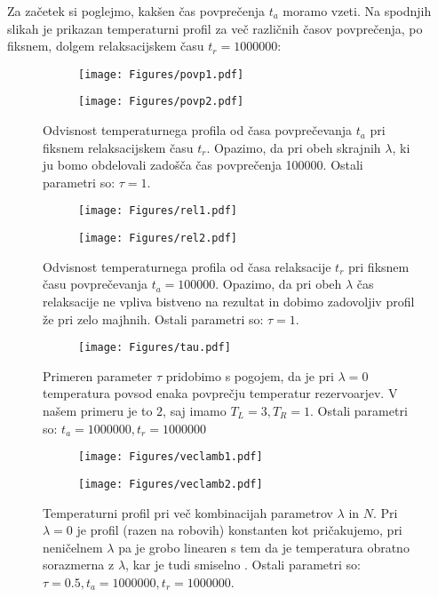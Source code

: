 \documentclass{article}
\begin{document}
Za začetek si poglejmo, kakšen čas povprečenja $t_a$ moramo vzeti. Na spodnjih slikah je prikazan temperaturni profil za več različnih časov povprečenja, po fiksnem, dolgem relaksacijskem času $t_r=1000000$:
\begin{figure}[H]
\centering
\begin{subfigure}{.49\textwidth}
\texttt{[image: Figures/povp1.pdf]}
\end{subfigure}
\begin{subfigure}{.49\textwidth}
\texttt{[image: Figures/povp2.pdf]}
\end{subfigure}
\caption*{Odvisnost temperaturnega profila od časa povprečevanja $t_a$ pri fiksnem relaksacijskem času $t_r$. Opazimo, da pri obeh skrajnih $\lambda$, ki ju bomo obdelovali zadošča čas povprečenja 100000. Ostali parametri so: $\tau=1$.}
\end{figure}

\begin{figure}[H]
\centering
\begin{subfigure}{.49\textwidth}
\texttt{[image: Figures/rel1.pdf]}
\end{subfigure}
\begin{subfigure}{.49\textwidth}
\texttt{[image: Figures/rel2.pdf]}
\end{subfigure}
\caption*{Odvisnost temperaturnega profila od časa relaksacije $t_r$ pri fiksnem času povprečevanja $t_a=100000$. Opazimo, da pri obeh $\lambda$ čas relaksacije ne vpliva bistveno na rezultat in dobimo zadovoljiv profil že pri zelo majhnih. Ostali parametri so: $\tau=1$.}
\end{figure}

\begin{figure}[H]
\centering
\begin{subfigure}{.7\textwidth}
\texttt{[image: Figures/tau.pdf]}
\end{subfigure}
\caption*{Primeren parameter $\tau$ pridobimo s pogojem, da je pri $\lambda=0$ temperatura povsod enaka povprečju temperatur rezervoarjev. V našem primeru je to $2$, saj imamo $T_L=3, T_R=1$. Ostali parametri so: $t_a=1000000, t_r=1000000$}
\end{figure}


\begin{figure}[H]
\centering
\begin{subfigure}{.49\textwidth}
\texttt{[image: Figures/veclamb1.pdf]}
\end{subfigure}
\begin{subfigure}{.49\textwidth}
\texttt{[image: Figures/veclamb2.pdf]}
\end{subfigure}
\caption*{Temperaturni profil pri več kombinacijah parametrov $\lambda$ in $N$. Pri $\lambda=0$ je profil (razen na robovih) konstanten kot pričakujemo, pri neničelnem $\lambda$ pa je grobo linearen s tem da je temperatura obratno sorazmerna z $\lambda$, kar je tudi smiselno . Ostali parametri so: $\tau=0.5, t_a=1000000, t_r=1000000$.}
\end{figure}
\end{document}
